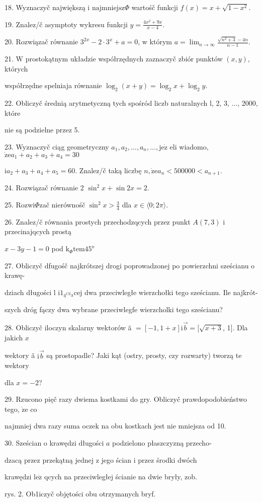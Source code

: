 \documentclass[a4paper,12pt]{article}
\begin{document}
18. Wyznaczyč największą i $\mathrm{n}\mathrm{a}\mathrm{j}\mathrm{m}\mathrm{n}\mathrm{i}\mathrm{e}\mathrm{j}\mathrm{s}\mathrm{z}\Phi$ wartośč funkcji $f(x)=x+\sqrt{1-x^{2}}.$

19. Znalez/č asymptoty wykresu funkcji $y=\displaystyle \frac{4x^{2}+9x}{x-4}.$

20. Rozwiązač równanie $3^{2x}-2\cdot 3^{x}+a=0$, w którym $a=\displaystyle \lim_{n\rightarrow\infty}\frac{\sqrt{n^{2}+3}-4n}{n-1}.$

21. $\mathrm{W}$ prostokątnym układzie współrzędnych zaznaczyč zbiór punktów $(x,y)$, których

współrzędne spelniaja równanie $\log_{2}(x+y)=\log_{2}x+\log_{2}y.$

22. Obliczyč średnią arytmetyczną tych spośród liczb naturalnych l, 2, 3, $\ldots$, 2000, które

nie są podzielne przez 5.

23. Wyznaczyč ciąg geometryczny $a_{1}, a_{2}, \ldots, a_{n}, \ldots, \mathrm{j}\mathrm{e}\dot{\mathrm{z}}$ eli wiadomo, $\dot{\mathrm{z}}\mathrm{e}a_{1}+a_{2}+a_{3}+a_{4}=30$

$\mathrm{i}a_{2}+a_{3}+a_{4}+a_{5}=60$. Znalez/č taką liczbę $n, \dot{\mathrm{z}}\mathrm{e}a_{n}<500000<a_{n+1}.$

24. Rozwiązač równanie 2 $\sin^{2}x+\sin 2x=2.$

25. Rozwi$\Phi$zač nierównośč $\displaystyle \sin^{2}x>\frac{3}{4}$ dla $x\in\langle 0;2\pi\rangle.$

26. Znalez/č równania prostych przechodzqcych przez punkt $A(7,3)$ i przecinajqcych prostą

$x-3y-1=0$ pod $\mathrm{k}_{\Phi}\mathrm{t}\mathrm{e}\mathrm{m}45^{\mathrm{o}}$

27. Obliczyč dfugośč najkrótszej drogi poprowadzonej po powierzchni sześcianu o krawę-

dziach długości l $\mathrm{i}1_{\text{ą}^{\mathrm{C}\mathrm{Z}}\mathrm{a}}\mathrm{c}\mathrm{e}\mathrm{j}$ dwa przeciwległe wierzchołki tego sześcianu. Ile najkrót-

szych dróg fączy dwa wybrane przeciwlegfe wierzcholki tego sześcianu?

28. Obliczyč iloczyn skalarny wektorów ã $= [-1,1+x] \mathrm{i} \vec{b}= [\sqrt{x+3}$, 1$]$. Dla jakich $x$

wektory ã $\mathrm{i}\vec{b}$ są prostopadle? Jaki kąt (ostry, prosty, czy rozwarty) tworzą te wektory

dla $x=-2$?

29. Rzucono pięč razy dwiema kostkami do gry. Obliczyč prawdopodobieństwo tego, $\dot{\mathrm{z}}\mathrm{e}$ co

najmniej dwa razy suma oczek na obu kostkach jest nie mniejsza od 10.

30. Sześcian o krawędzi długości $a$ podzielono płaszczyzną przecho-

dzacą przez przekątną jednej z jego ścian i przez środki dwóch

krawędzi $\mathrm{l}\mathrm{e}\dot{\mathrm{z}}$ qcych na przeciwległej ścianie na dwie bryły, zob.

rys. 2. Ob1iczyč objętości obu otrzymanych bryf.
\end{document}
